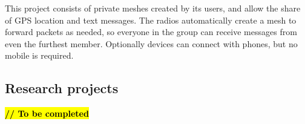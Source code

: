 					This project consists of private meshes created by its users, and allow the share of GPS location and text messages.					
					The radios automatically create a mesh to forward packets as needed, so everyone in the group can receive messages from even the furthest member. 
					Optionally devices can connect with phones, but no mobile is required.
		
		\subsection{Research projects}
		
			\textbf{\textcolor{red}{\hl{// To be completed}}}
		
%			
%		
%			
%			
%			
%			
